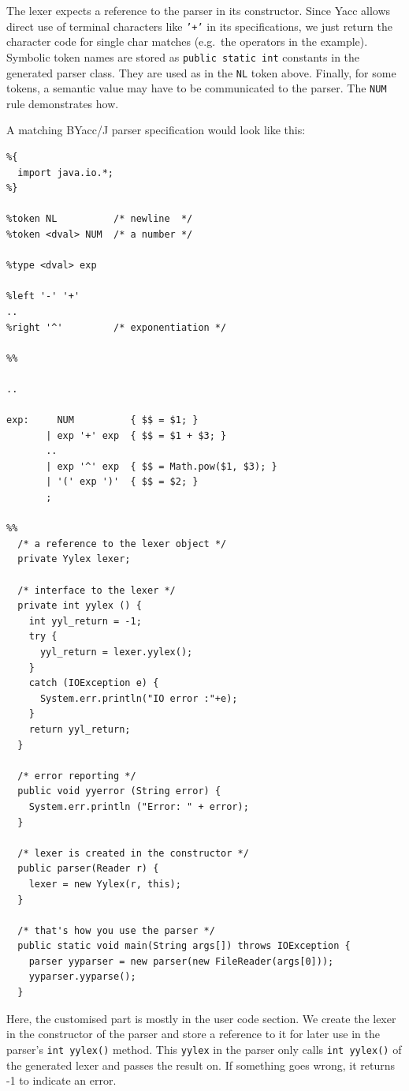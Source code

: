 The lexer expects a reference to the parser in its constructor. Since
Yacc allows direct use of terminal characters like \texttt{’+’} in its
specifications, we just return the character code for single char
matches (e.g.~the operators in the example). Symbolic token names are
stored as \texttt{public\ static\ int} constants in the generated parser
class. They are used as in the \texttt{NL} token above. Finally, for
some tokens, a semantic value may have to be communicated to the parser.
The \texttt{NUM} rule demonstrates how.

A matching BYacc/J parser specification would look like this:

\begin{verbatim}
%{
  import java.io.*;
%}
      
%token NL          /* newline  */
%token <dval> NUM  /* a number */

%type <dval> exp

%left '-' '+'
..
%right '^'         /* exponentiation */
      
%%

..
      
exp:     NUM          { $$ = $1; }
       | exp '+' exp  { $$ = $1 + $3; }
       ..
       | exp '^' exp  { $$ = Math.pow($1, $3); }
       | '(' exp ')'  { $$ = $2; }
       ;

%%
  /* a reference to the lexer object */
  private Yylex lexer;

  /* interface to the lexer */
  private int yylex () {
    int yyl_return = -1;
    try {
      yyl_return = lexer.yylex();
    }
    catch (IOException e) {
      System.err.println("IO error :"+e);
    }
    return yyl_return;
  }

  /* error reporting */
  public void yyerror (String error) {
    System.err.println ("Error: " + error);
  }

  /* lexer is created in the constructor */
  public parser(Reader r) {
    lexer = new Yylex(r, this);
  }

  /* that's how you use the parser */
  public static void main(String args[]) throws IOException {
    parser yyparser = new parser(new FileReader(args[0]));
    yyparser.yyparse();    
  }
\end{verbatim}

Here, the customised part is mostly in the user code section. We create
the lexer in the constructor of the parser and store a reference to it
for later use in the parser's \texttt{int\ yylex()} method. This
\texttt{yylex} in the parser only calls \texttt{int\ yylex()} of the
generated lexer and passes the result on. If something goes wrong, it
returns -1 to indicate an error.

